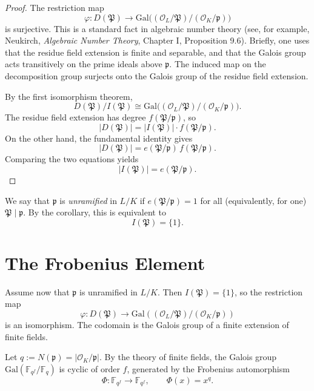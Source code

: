 \begin{proof}
The restriction map
\[
\varphi: D(\mathfrak{P}) \longrightarrow \mathrm{Gal}\big((\mathcal{O}_L/\mathfrak{P}) / (\mathcal{O}_K/\mathfrak{p})\big)
\]
is surjective. This is a standard fact in algebraic number theory (see, for example, Neukirch, \emph{Algebraic Number Theory}, Chapter I, Proposition 9.6). Briefly, one uses that the residue field extension is finite and separable, and that the Galois group acts transitively on the prime ideals above \(\mathfrak{p}\). The induced map on the decomposition group surjects onto the Galois group of the residue field extension.

By the first isomorphism theorem,
\[
D(\mathfrak{P})/I(\mathfrak{P}) \cong \mathrm{Gal}\big((\mathcal{O}_L/\mathfrak{P}) / (\mathcal{O}_K/\mathfrak{p})\big).
\]
The residue field extension has degree \(f(\mathfrak{P}/\mathfrak{p})\), so
\[
|D(\mathfrak{P})| = |I(\mathfrak{P})| \cdot f(\mathfrak{P}/\mathfrak{p}).
\]
On the other hand, the fundamental identity gives
\[
|D(\mathfrak{P})| = e(\mathfrak{P}/\mathfrak{p}) \, f(\mathfrak{P}/\mathfrak{p}).
\]
Comparing the two equations yields
\[
|I(\mathfrak{P})| = e(\mathfrak{P}/\mathfrak{p}).
\]
\end{proof}

\begin{defn}
We say that \(\mathfrak{p}\) is \emph{unramified} in \(L/K\) if \(e(\mathfrak{P}/\mathfrak{p}) = 1\) for all (equivalently, for one) \(\mathfrak{P} \mid \mathfrak{p}\). By the corollary, this is equivalent to
\[
I(\mathfrak{P}) = \{1\}.
\]
\end{defn}

\section{The Frobenius Element}

Assume now that \(\mathfrak{p}\) is unramified in \(L/K\). Then \(I(\mathfrak{P}) = \{1\}\), so the restriction map
\[
\varphi: D(\mathfrak{P}) \longrightarrow \mathrm{Gal}((\mathcal{O}_L/\mathfrak{P}) / (\mathcal{O}_K/\mathfrak{p}))
\]
is an isomorphism. The codomain is the Galois group of a finite extension of finite fields.

Let \(q := N(\mathfrak{p}) = |\mathcal{O}_K/\mathfrak{p}|\). By the theory of finite fields, the Galois group \(\mathrm{Gal}(\mathbb{F}_{q^f}/\mathbb{F}_q)\) is cyclic of order \(f\), generated by the Frobenius automorphism
\[
\Phi: \mathbb{F}_{q^f} \to \mathbb{F}_{q^f}, \qquad \Phi(x) = x^{q}.
\]

